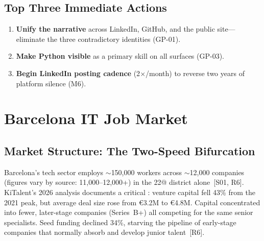 \documentclass[a4paper,11pt,openany]{report}
\begin{document}
\section{Top Three Immediate Actions}

\begin{enumerate}
  \item \textbf{Unify the narrative} across LinkedIn, GitHub, and the public
    site---eliminate the three contradictory identities (GP-01).
  \item \textbf{Make Python visible} as a primary skill on all surfaces
    (GP-03).
  \item \textbf{Begin LinkedIn posting cadence} (2$\times$/month) to reverse
    two years of platform silence (M6).
\end{enumerate}



\chapter{Barcelona IT Job Market}
\label{ch:market}


\section{Market Structure: The Two-Speed Bifurcation}

Barcelona's tech sector employs $\sim$150,000 workers across $\sim$12,000
companies (figures vary by source: 11,000--12,000+) in the 22@ district
alone~[S01, R6]. KiTalent's 2026 analysis documents a critical
: venture capital fell 43\% from the 2021 peak, but
average deal size rose from €3.2M to €4.8M. Capital concentrated into fewer,
later-stage companies (Series~B+) all competing for the same senior
specialists. Seed funding declined 34\%, starving the pipeline of early-stage
companies that normally absorb and develop junior talent~[R6].
\end{document}
